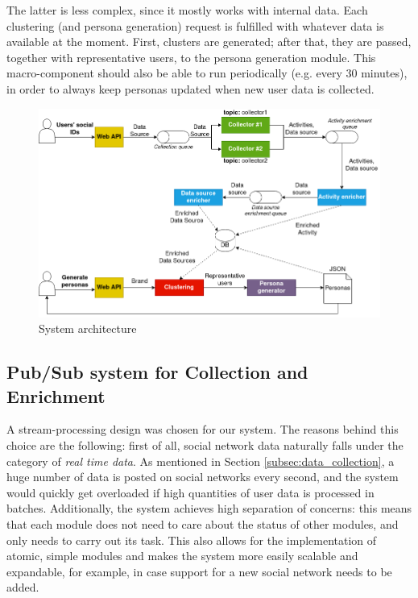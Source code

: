 The latter is less complex, since it mostly works with internal data. Each clustering (and persona generation) request is fulfilled with whatever data is available at the moment. First, clusters are generated; after that, they are passed, together with representative users, to the persona generation module. This macro-component should also be able to run periodically (e.g. every 30 minutes), in order to always keep personas updated when new user data is collected.

\begin{figure}
\centering
\includegraphics[width=\textwidth]{img/Architecture.png}
\caption{System architecture}
\label{fig:architecture}
\end{figure}

\subsection{Pub/Sub system for Collection and Enrichment}
\label{subsec:pub/sub}
A stream-processing design was chosen for our system. The reasons behind this choice are the following: first of all, social network data naturally falls under the category of \emph{real time data}. As mentioned in Section \ref{subsec:data_collection}, a huge number of data is posted on social networks every second, and the system would quickly get overloaded if high quantities of user data is processed in batches. Additionally, the system achieves high separation of concerns: this means that each module does not need to care about the status of other modules, and only needs to carry out its task. This also allows for the implementation of atomic, simple modules and makes the system more easily scalable and expandable, for example, in case support for a new social network needs to be added.
 
